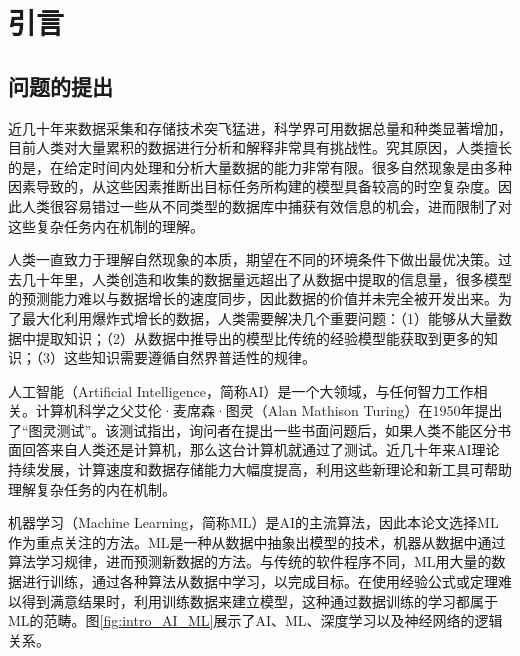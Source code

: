 \chapter{引言}\label{chap:introduction}

\section{问题的提出}\label{sec:intro_question}

近几十年来数据采集和存储技术突飞猛进，科学界可用数据总量和种类显著增加，目前人类对大量累积的数据进行分析和解释非常具有挑战性\citep{bougher2016machine}。究其原因，人类擅长的是，在给定时间内处理和分析大量数据的能力非常有限\citep{bougher2016machine}。很多自然现象是由多种因素导致的，从这些因素推断出目标任务所构建的模型具备较高的时空复杂度\citep{reitsma2010geoscience}。因此人类很容易错过一些从不同类型的数据库中捕获有效信息的机会，进而限制了对这些复杂任务内在机制的理解\citep{feyyad1996data}。

人类一直致力于理解自然现象的本质，期望在不同的环境条件下做出最优决策。过去几十年里，人类创造和收集的数据量远超出了从数据中提取的信息量，很多模型的预测能力难以与数据增长的速度同步，因此数据的价值并未完全被开发出来。为了最大化利用爆炸式增长的数据，人类需要解决几个重要问题：（1）能够从大量数据中提取知识；（2）从数据中推导出的模型比传统的经验模型能获取到更多的知识；（3）这些知识需要遵循自然界普适性的规律。

人工智能（Artificial Intelligence，简称AI）是一个大领域，与任何智力工作相关。计算机科学之父艾伦·麦席森·图灵（Alan Mathison Turing）在1950年提出了“图灵测试”。该测试指出，询问者在提出一些书面问题后，如果人类不能区分书面回答来自人类还是计算机，那么这台计算机就通过了测试\citep{turing2009computing}。近几十年来AI理论持续发展，计算速度和数据存储能力大幅度提高，利用这些新理论和新工具可帮助理解复杂任务的内在机制。

机器学习（Machine Learning，简称ML）是AI的主流算法，因此本论文选择ML作为重点关注的方法。ML是一种从数据中抽象出模型的技术，机器从数据中通过算法学习规律，进而预测新数据的方法。与传统的软件程序不同，ML用大量的数据进行训练，通过各种算法从数据中学习，以完成目标。在使用经验公式或定理难以得到满意结果时，利用训练数据来建立模型，这种通过数据训练的学习都属于ML的范畴。图\ref{fig:intro_AI_ML}展示了AI、ML、深度学习以及神经网络的逻辑关系。

